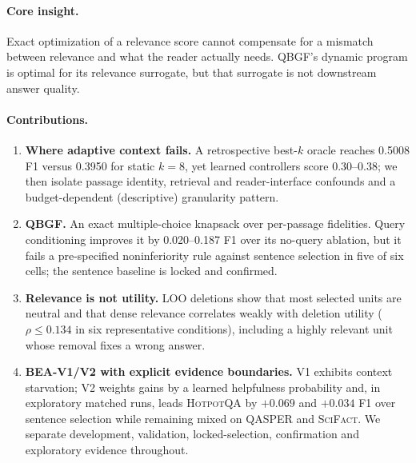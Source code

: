 \documentclass[10pt,twocolumn,letterpaper]{article}
\newcommand{\hotpot}{\textsc{HotpotQA}\xspace}
\newcommand{\qasper}{\textsc{QASPER}\xspace}
\newcommand{\scifact}{\textsc{SciFact}\xspace}
\begin{document}
\paragraph{Core insight.} Exact optimization of a relevance score cannot compensate for a mismatch between relevance and what the reader actually needs. QBGF's dynamic program is optimal for its relevance surrogate, but that surrogate is not downstream answer quality.

\paragraph{Contributions.}
\begin{enumerate}
\item \textbf{Where adaptive context fails.} A retrospective best-$k$ oracle reaches 0.5008 F1 versus 0.3950 for static $k{=}8$, yet learned controllers score 0.30--0.38; we then isolate passage identity, retrieval and reader-interface confounds and a budget-dependent (descriptive) granularity pattern.
\item \textbf{QBGF.} An exact multiple-choice knapsack over per-passage fidelities. Query conditioning improves it by 0.020--0.187 F1 over its no-query ablation, but it fails a pre-specified noninferiority rule against sentence selection in five of six cells; the sentence baseline is locked and confirmed.
\item \textbf{Relevance is not utility.} LOO deletions show that most selected units are neutral and that dense relevance correlates weakly with deletion utility ($\rho\le0.134$ in six representative conditions), including a highly relevant unit whose removal fixes a wrong answer.
\item \textbf{BEA-V1/V2 with explicit evidence boundaries.} V1 exhibits context starvation; V2 weights gains by a learned helpfulness probability and, in exploratory matched runs, leads \hotpot by $+0.069$ and $+0.034$ F1 over sentence selection while remaining mixed on \qasper and \scifact. We separate development, validation, locked-selection, confirmation and exploratory evidence throughout.
\end{enumerate}



\end{document}
